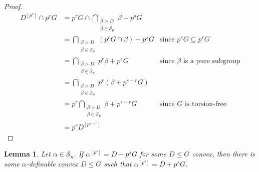 \documentclass[a4paper,11pt]{article}
\newtheorem{lemma}[theorem]{Lemma}
\newcommand{\tx}{\textrm}
\newcommand{\Sn}{\mathcal{S}_n}
\begin{document}
\begin{proof}
	\begin{align*}
		 D^{[p^s]}\cap p^rG  &= p^rG\cap\bigcap\limits_{\substack{ \beta > D\\\beta\in \mathcal{S}_p}}\beta+p^{s}G \\
		&= \bigcap\limits_{\substack{ \beta > D\\\beta\in \mathcal{S}_p}}(p^rG\cap\beta)+p^{s}G & \tx{since } p^sG\subseteq p^rG\\
		&= \bigcap\limits_{\substack{ \beta > D\\\beta\in \mathcal{S}_p}}p^r\beta+p^{s}G & \tx{since }\beta\tx{ is a pure subgroup} \\
		&= \bigcap\limits_{\substack{ \beta > D\\\beta\in \mathcal{S}_p}}p^r(\beta+p^{s-r}G) \\
		&= p^r\bigcap\limits_{\substack{ \beta > D\\\beta\in \mathcal{S}_p}}\beta+p^{s-r}G & \tx{since }G\tx{ is torsion-free} \\
		&= p^rD^{[p^{s-r}]}
	\end{align*}
	
	
\end{proof}
\begin{lemma}\label{convex implies definable convex}
	Let $\alpha\in\Sn$. If $\alpha^{[p^s]}= D+p^sG$ for some $D\leq G$ convex, then there is some $\alpha$-definable convex $D\leq G$ such that $\alpha^{[p^s]} = D +p^sG$.
\end{lemma}
\end{document}
